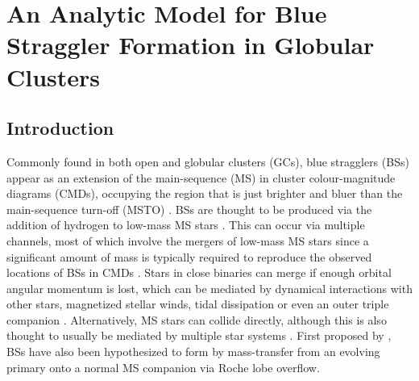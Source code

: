 \pagestyle{fancy}
\headheight 20pt
\chead{}
\lfoot{}
\cfoot{\thepage}
\rfoot{}
\renewcommand{\headrulewidth}{0.1pt}
\renewcommand{\footrulewidth}{0.1pt}




\chapter{An Analytic Model for
  Blue Straggler Formation in Globular Clusters} \label{chapter5}
%
\thispagestyle{fancy}

\section{Introduction} \label{intro5}

Commonly found in both open and globular clusters (GCs), blue
stragglers (BSs) appear as an
extension of the main-sequence (MS) in cluster colour-magnitude
diagrams (CMDs), occupying the region that is just brighter and bluer
than the main-sequence turn-off (MSTO) 
\citep{sandage53}.  BSs are
thought to be produced via the addition of hydrogen to 
low-mass MS stars \citep[e.g.][]{sills01, lombardi02}.  This can
occur via multiple channels, most of which involve the mergers of
low-mass MS stars since a significant amount of mass is typically
required to reproduce the observed locations of BSs in CMDs
\citep[e.g.][]{sills99}.  Stars in close binaries can merge if enough
orbital angular momentum is lost, which can be mediated by dynamical
interactions with other stars, magnetized stellar winds, tidal
dissipation or even an outer triple companion
\citep[e.g.][]{leonard92, li06, perets09, dervisoglu10}.
Alternatively, MS stars can collide directly, although this is
also thought to usually be mediated by multiple star systems
\citep[e.g.][]{leonard89, leonard95, fregeau04, leigh11b}.  First proposed by
\citet{mccrea64}, BSs have also been hypothesized to form by
mass-transfer from an evolving primary onto a normal MS companion
via Roche lobe overflow.

